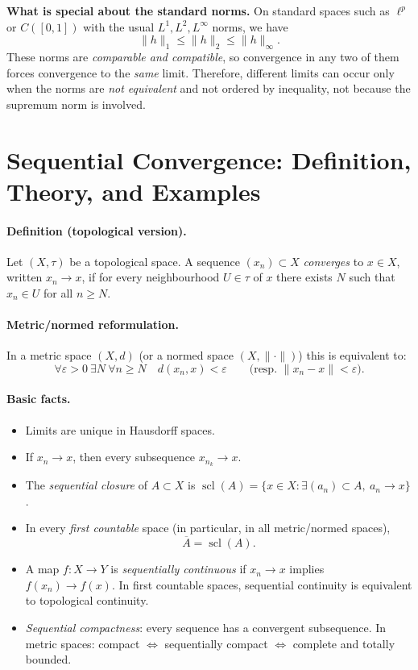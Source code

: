 \documentclass[12pt,a4paper]{article}
\theoremstyle{plain}
\theoremstyle{definition}
\theoremstyle{remark}
\theoremstyle{remark}
\begin{document}
\medskip
\noindent\textbf{What is special about the standard norms.}
On standard spaces such as $\ell^p$ or $C([0,1])$ with the usual $L^1,L^2,L^\infty$ norms, we have
\[
\|h\|_{1}\le\|h\|_{2}\le\|h\|_{\infty}.
\]
These norms are \emph{comparable and compatible}, so convergence in any two of them
forces convergence to the \emph{same} limit.
Therefore, different limits can occur only when the norms are \emph{not equivalent}
and not ordered by inequality, not because the supremum norm is involved.

\section*{Sequential Convergence: Definition, Theory, and Examples}

\paragraph{Definition (topological version).}
Let $(X,\tau)$ be a topological space. A sequence $(x_n)\subset X$ \emph{converges} to $x\in X$,
written $x_n\to x$, if for every neighbourhood $U\in\tau$ of $x$ there exists $N$ such that
$x_n\in U$ for all $n\ge N$.

\paragraph{Metric/normed reformulation.}
In a metric space $(X,d)$ (or a normed space $(X,\|\cdot\|)$) this is equivalent to:
\[
\forall\varepsilon>0\ \exists N\ \forall n\ge N\quad d(x_n,x)<\varepsilon
\qquad\big(\text{resp. }\|x_n-x\|<\varepsilon\big).
\]

\paragraph{Basic facts.}
\begin{itemize}
	\item Limits are unique in Hausdorff spaces.
	\item If $x_n\to x$, then every subsequence $x_{n_k}\to x$.
	\item The \emph{sequential closure} of $A\subset X$ is
	$\operatorname{scl}(A)=\{x\in X:\exists (a_n)\subset A,\ a_n\to x\}$.
	\item In every \emph{first countable} space (in particular, in all metric/normed spaces),
	\[
	\overline{A}=\operatorname{scl}(A).
	\]
	\item A map $f:X\to Y$ is \emph{sequentially continuous} if $x_n\to x$ implies $f(x_n)\to f(x)$.
	In first countable spaces, sequential continuity is equivalent to topological continuity.
	\item \emph{Sequential compactness}: every sequence has a convergent subsequence.
	In metric spaces: compact $\iff$ sequentially compact $\iff$ complete and totally bounded.
\end{itemize}
\end{document}

